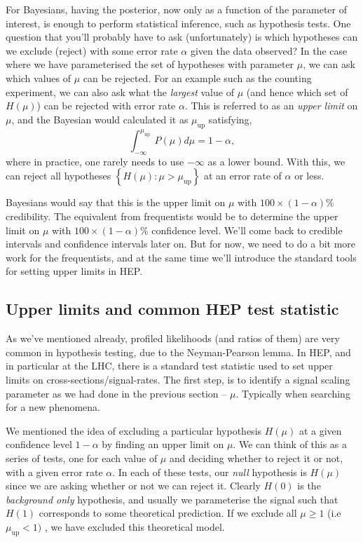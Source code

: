 For Bayesians, having the posterior, now only as a function of the parameter of interest, is enough to perform statistical inference, such as hypothesis tests. One question that you'll probably have to ask (unfortunately) is which hypotheses can we exclude (reject) with some error rate $\alpha$ given the data observed? In the case where we have parameterised the set of hypotheses with parameter $\mu$, we can ask which values of $\mu$ can be rejected. For an example such as the counting experiment, we can also ask what the \emph{largest} value of $\mu$ (and hence which set of $H(\mu)$) can be rejected with error rate $\alpha$. This is referred to as an \emph{upper limit} on $\mu$, and the Bayesian would calculated it as $\mu_{\mathrm{up}}$ satisfying, 
\begin{equation}
    \int_{-\infty}^{\mu_{\mathrm{up}}}P(\mu)d\mu = 1-\alpha,
\end{equation}
where in practice, one rarely needs to use $-\infty$ as a lower bound. With this, we can reject all hypotheses $\left\{H(\mu):\mu>\mu_{\mathrm{up}}\right\}$ at an error rate of $\alpha$ or less. 

Bayesians would say that this is the upper limit on $\mu$ with $100\times(1-\alpha)$\% credibility. The equivalent from frequentists would be to determine the upper limit on $\mu$ with $100\times(1-\alpha)$\% confidence level. We'll come back to credible intervals and confidence intervals later on. But for now, we need to do a bit more work for the frequentists, and at the same time we'll introduce the standard tools for setting upper limits in HEP. 

\subsection{Upper limits and common HEP test statistic}
As we've mentioned already, profiled likelihoods (and ratios of them) are very common in hypothesis testing, due to the Neyman-Pearson lemma. In HEP, and in particular at the LHC, there is a standard test statistic used to set upper limits on cross-sections/signal-rates. The first step, is to identify a signal scaling parameter as we had done in the previous section -- $\mu$. Typically when searching for a new phenomena. 

We mentioned the idea of excluding a particular hypothesis $H(\mu)$ at a given confidence level $1-\alpha$ by finding an upper limit on $\mu$. We can think of this as a series of tests, one for each value of $\mu$
and deciding whether to reject it or not, with a given error rate $\alpha$. In each of these tests, our \emph{null} hypothesis is $H(\mu)$ since we are asking whether or not we can reject it. Clearly $H(0)$ is the \emph{background only} hypothesis, and usually we parameterise the signal such that $H(1)$ corresponds to some theoretical prediction. If we exclude all $\mu\geq 1$ (i.e $\mu_{\mathrm{up}}<1)$ , we have excluded this theoretical model. 

